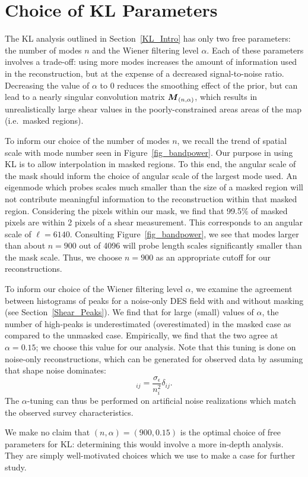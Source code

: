 \chapter{Choice of KL Parameters}
\label{Choosing_Params}
The KL analysis outlined in Section~\ref{KL_Intro}
has only two free parameters: the number of
modes $n$ and the Wiener filtering level $\alpha$.  Each of these parameters
involves a trade-off: using more modes increases the amount of information
used in the reconstruction, but at the expense of a decreased signal-to-noise
ratio.  Decreasing the value of $\alpha$ to $0$ reduces the smoothing effect 
of the prior, but can lead to a nearly singular convolution matrix 
$\boldsymbol{M}_{(n,\alpha)}$, 
which results in unrealistically large shear values in the poorly-constrained 
areas areas of the map (i.e.~masked regions).

To inform our choice of the number of modes $n$, we recall the trend of 
spatial scale with mode number seen in Figure~\ref{fig_bandpower}.  Our 
purpose in using KL is to allow interpolation in masked regions.  To this 
end, the angular scale of the mask should inform the choice of angular
scale of the largest mode used.  An eigenmode which probes scales much smaller
than the size of a masked region will not contribute meaningful information to
the reconstruction within that masked region.  Considering the pixels within
our mask, we find that 99.5\% of masked pixels are within 2 pixels of a
shear measurement.  This corresponds to an angular scale of $\ell=6140$.
Consulting Figure~\ref{fig_bandpower}, we see that modes larger than
about $n=900$ out of 4096 will probe length scales significantly 
smaller than the mask scale.  
Thus, we choose $n=900$ as an appropriate cutoff for our reconstructions.

To inform our choice of the Wiener filtering level $\alpha$, we examine the
agreement between histograms of \Map peaks for a noise-only DES field
with and without masking (see Section~\ref{Shear_Peaks}).  
We find that for large (small) values of $\alpha$, the number
of high-\Map peaks is underestimated (overestimated) in the masked 
case as compared to the unmasked case.  
Empirically, we find that the two agree at $\alpha = 0.15$; 
we choose this value for our analysis.  Note that this 
tuning is done on noise-only reconstructions, 
which can be generated for observed data by assuming that
shape noise dominates: 
\begin{equation}
  [\Noise_\gamma]_{ij} = \frac{\sigma_\epsilon}{n_i^2}\delta_{ij}.
\end{equation}
The $\alpha$-tuning can thus be performed on artificial noise realizations 
which match the observed survey characteristics.

We make no claim that $(n,\alpha) = (900,0.15)$ is the optimal
choice of free parameters for KL: determining this would involve a more
in-depth analysis.  They are simply well-motivated choices which we use to
make a case for further study.
